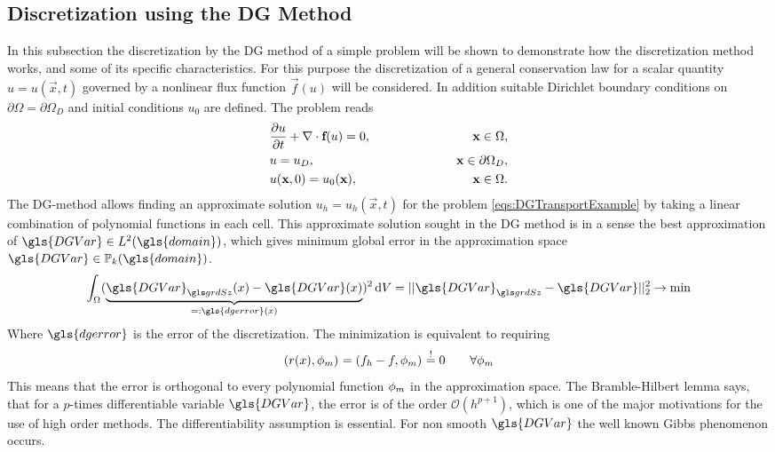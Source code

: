 \subsection{Discretization using the DG Method} \label{sec:DiscWithDG}
In this subsection the discretization by the DG method of a simple problem will be shown to demonstrate how the discretization method works, and some of its specific characteristics. For this purpose the discretization of a general conservation law for a scalar quantity $u = u(\vec{x},t)$ governed by a nonlinear flux function $\vec{f}(u)$ will be considered. In addition suitable Dirichlet boundary conditions on $\partial \Omega = \partial \Omega_D$ and initial conditions $u_0$ are defined. The problem reads
\begin{subequations}
\begin{align}
&\frac{\partial u}{\partial t} + \nabla \cdot \textbf{f}(u) = 0, \qquad\qquad\qquad &\textbf{x} \in \Omega,\label{eq:consEqDG}\\
&u = u_D, \qquad \qquad \qquad  &\textbf{x} \in \partial \Omega_D,\\
&u(\textbf{x},0) = u_0(\textbf{x}), \qquad\qquad\qquad &\textbf{x}\in\Omega.
\end{align}\label{eqs:DGTransportExample}
\end{subequations}
The DG-method allows finding an approximate solution $u_h = u_h(\vec{x},t)$ for the problem \cref{eqs:DGTransportExample} by taking a linear combination of polynomial functions in each cell. 
This approximate solution sought in the DG method is in a sense the best approximation of $\gls{DGVar} \in L^2(\gls{domain})$, which gives minimum global error in the approximation space $\gls{DGVar} \in 	\mathbb{P}_k(\gls{domain} )$. 
\begin{align}
	\int_{\domain} (\underbrace{ \nuM{\gls{DGVar}}(x)-\gls{DGVar}(x) }_{=: \gls{dgerror}(x)})^2 \dV
	= ||\nuM{\gls{DGVar}} - \gls{DGVar}||_2^2 \rightarrow \text{min}
\end{align}
Where $\gls{dgerror}$ is the error of the discretization. The minimization is equivalent to requiring
\begin{equation}
	\label{eq:L2projection}
	\left( r(x) , \phi{}_m \right)_{} = \left( f_h-f , \phi{}_m \right)_{} \stackrel{!}{=} 0 \qquad \forall\phi{}_m
\end{equation}
This means that the error is orthogonal to every polynomial function $ \phi{}_m$ in the approximation space. The Bramble-Hilbert lemma \parencite{brambleEstimationLinearFunctionals1970} says, that for a $p$-times differentiable variable $\gls{DGVar}$, the error is of the order $\mathcal{O}(h^{p+1})$, which is one of the major motivations for the use of high order methods. The differentiability assumption is essential. For non smooth $\gls{DGVar}$ the well known Gibbs phenomenon occurs.

